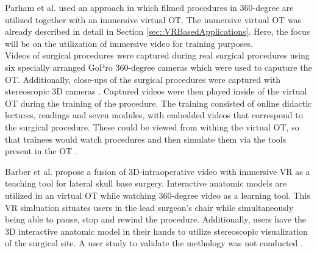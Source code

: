Parham et al. \cite{Parham.2019} used an approach in which filmed procedures in 360-degree are utilized together with an immersive virtual OT.
The immersive virtual OT was already described in detail in Section \ref{sec::VRBasedApplications}. Here, the focus will be on the utilization of immersive 
video for training purposes.
\\ Videos of surgical procedures were captured during real surgical procedures using six specially arranged GoPro 360-degree cameras which were used to caputure the OT.
Additionally, close-ups of the surgical procedures were captured with stereoscopic 3D cameras \cite{Parham.2019}.
Captured videos were then played inside of the virtual OT during the training of the procedure.
The training consisted of online didactic lectures, readings and seven modules, with embedded videos that correspond to the surgical procedure.
These could be viewed from withing the virtual OT, so that trainees would watch procedures and then simulate them via the tools present in the OT \cite{Parham.2019}.

Barber et al. \cite{Barber.2020} propose a fusion of 3D-intraoperative 
video with immersive VR as a teaching tool for lateral skull base surgery.
Interactive anatomic models are utilized in an virtual OT while watching 
360-degree video as a learning tool.
This VR simluation situates users in the lead surgeon's chair while 
simultaneously being able to pause, stop and rewind the procedure.
Additionally, users have the 3D interactive anatomic model in their 
hands to utilize stereoscopic visualization of the surgical 
site. A user study to validate the 
methology was not conducted \cite{Barber.2020}.

